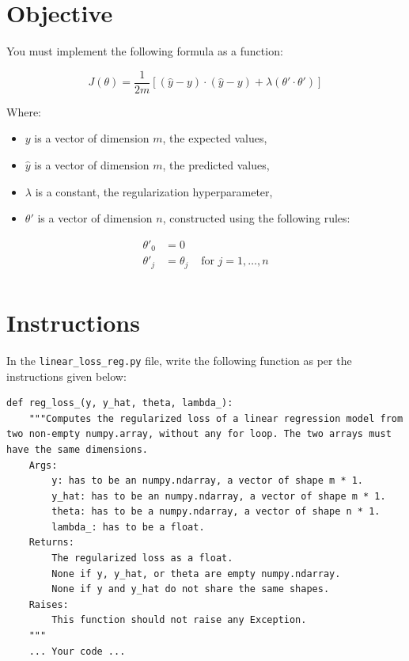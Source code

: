 \documentclass{42-en}
\begin{document}
\section*{Objective}
You must implement the following formula as a function:  

$$
J(\theta)  =  \frac{1}{2m}[(\hat{y} - y)\cdot(\hat{y} - y) + \lambda (\theta' \cdot \theta')]
$$  

Where:
\begin{itemize}
  \item $y$ is a vector of dimension $m$, the expected values,
  \item $\hat{y}$ is a vector of dimension $m$, the predicted values,
  \item $\lambda$ is a constant, the regularization hyperparameter,
  \item $\theta'$ is a vector of dimension $n$, constructed using the following rules:
\end{itemize}
  
$$
\begin{matrix}
\theta'_0 & =  0 \\
\theta'_j & =  \theta_j & \text{ for } j = 1, \dots, n\\
\end{matrix}
$$

\section*{Instructions}
In the \texttt{linear\_loss\_reg.py} file, write the following function as per the instructions given below:

\begin{verbatim}
def reg_loss_(y, y_hat, theta, lambda_):
	"""Computes the regularized loss of a linear regression model from two non-empty numpy.array, without any for loop. The two arrays must have the same dimensions.
	Args:
		y: has to be an numpy.ndarray, a vector of shape m * 1.
		y_hat: has to be an numpy.ndarray, a vector of shape m * 1.
		theta: has to be a numpy.ndarray, a vector of shape n * 1.
		lambda_: has to be a float.
	Returns:
		The regularized loss as a float.
		None if y, y_hat, or theta are empty numpy.ndarray.
		None if y and y_hat do not share the same shapes.
	Raises:
		This function should not raise any Exception.
	"""
	... Your code ...
\end{verbatim}
\end{document}
